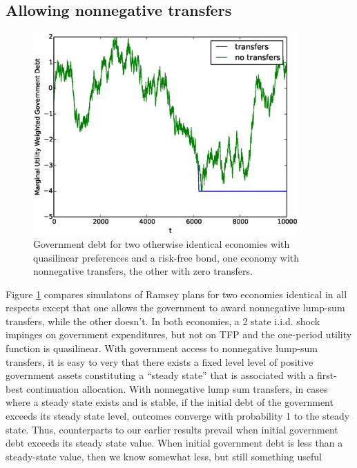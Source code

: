 \documentclass[12pt]{article}
\newcommand{\tjs}[1]{\textcolor{red}{$^{\textrm{tjs}}${#1}}}
\begin{document}
\subsection{Allowing nonnegative transfers}
\begin{figure}[h]
	\begin{center}
	\includegraphics[width=4in]{Images/transfer_example2.eps}
\caption{Government  debt for two otherwise identical economies with quasilinear preferences and a risk-free bond, one economy   with nonnegative transfers, the other with zero transfers.\label{fig:nonnegative_transfers}}
	\end{center}
\end{figure}
	Figure \ref{fig:nonnegative_transfers} compares simulatons of Ramsey plans for two economies identical in all respects except that one allows the government to award nonnegative lump-sum
	transfers, while the other doesn't.
	In both economies, a 2 state i.i.d. shock impinges on  government expenditures, but not on TFP and the one-period utility function is  quasilinear.
	With government access to nonnegative lump-sum transfers, it is easy to very that  there exists
	a fixed level  level of positive government assets constituting a  ``steady state'' that is associated with a first-best continuation allocation.
	With nonnegative lump sum transfers,  in cases where a steady state exists and is stable,  if the initial debt of the government exceeds its steady state level,
	outcomes   converge with probability 1 to the steady state. Thus, counterparts to our earlier results prevail  when
initial government debt exceeds its steady state value.  When initial government debt is less than a steady-state value, then we know  somewhat  less, but still something useful
\end{document}
